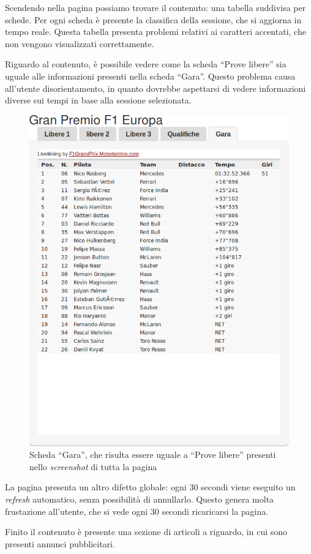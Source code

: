 Scendendo nella pagina possiamo trovare il contenuto: una tabella suddivisa per
schede. Per ogni scheda è presente la classifica della sessione, che si aggiorna
in tempo reale. Questa tabella presenta problemi relativi ai caratteri
accentati, che non vengono visualizzati correttamente.

Riguardo al contenuto, è possibile vedere come la scheda ``Prove libere''
sia uguale alle informazioni presenti nella scheda ``Gara''. Questo problema
causa all'utente disorientamento, in quanto dovrebbe aspettarsi di vedere
informazioni diverse sui tempi in base alla sessione selezionata.

\begin{figure}[H]

  \centering
  \includegraphics[scale=0.5]{res/img/dettagli/tableScore}
  \caption{Scheda ``Gara'', che risulta essere uguale a ``Prove libere''
    presenti nello \textit{screenshot} di tutta la pagina} 
\end{figure}

La pagina presenta un altro difetto globale: ogni 30 secondi viene eseguito un
\textit{refresh} automatico, senza possibilità di annullarlo. Questo genera
molta frustazione all'utente, che si vede ogni 30 secondi ricaricarsi la pagina.

Finito il contenuto è presente una sezione di articoli a riguardo, in cui sono
presenti annunci pubblicitari.
